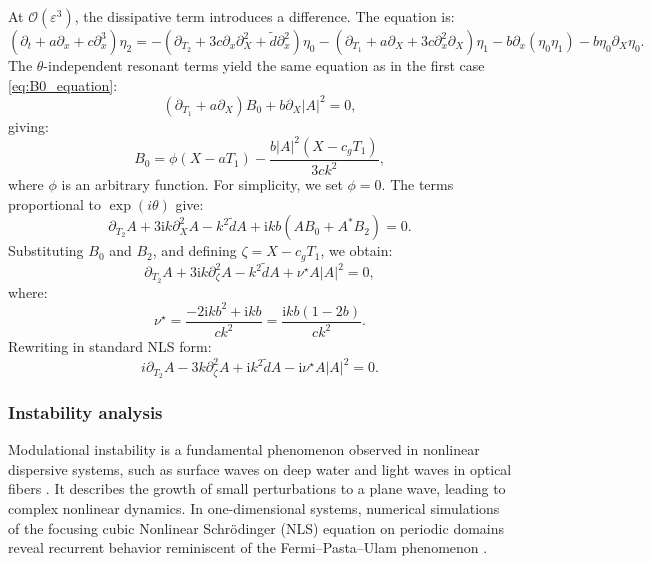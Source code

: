 \documentclass[alpha-refs, 12pt]{wiley-article}
\renewcommand{\O}{\mathcal{O}}
\newcommand{\ui}{\mathrm{i}}
\newcommand{\eps}{\varepsilon}
\begin{document}
At $\O(\eps^3)$, the dissipative term introduces a difference. The equation is:
\begin{equation}\label{eq:third_order_intermediate}
  \left( \partial_t + a \partial_x + c \partial_x^3 \right) \eta_2 = - \left( \partial_{T_2} + 3 c \partial_x \partial_X^2 + \tilde{d} \partial_x^2 \right) \eta_0 - \left( \partial_{T_1} + a \partial_X + 3 c \partial_x^2 \partial_X \right) \eta_1 - b \partial_x ( \eta_0 \eta_1 ) - b \eta_0 \partial_X \eta_0.
\end{equation}
The $\theta$-independent resonant terms yield the same equation as in the first case \eqref{eq:B0_equation}:
\[
  \left( \partial_{T_1} + a \partial_X \right) B_0 + b \partial_X |A|^2 = 0,
\]
giving:
\[
  B_0 = \phi(X - a T_1) - \frac{b |A|^2 (X - c_g T_1)}{3 c k^2},
\]
where $\phi$ is an arbitrary function. For simplicity, we set $\phi = 0$. The terms proportional to $\exp(i \theta)$ give:
\begin{equation}\label{eq:resonant_theta_intermediate}
  \partial_{T_2} A + 3 \ui k \partial_X^2 A - k^2 \tilde{d} A + \ui k b \left( A B_0 + A^* B_2 \right) = 0.
\end{equation}
Substituting $B_0$ and $B_2$, and defining $\zeta = X - c_g T_1$, we obtain:
\begin{equation*}%
  \partial_{T_2} A + 3 \ui k \partial_\zeta^2 A - k^2 \tilde{d} A + \nu^\star A |A|^2 = 0,
\end{equation*}
where:
\[
  \nu^\star = \frac{-2 \ui k b^2 + \ui k b}{c k^2} = \frac{\ui k b (1 - 2 b)}{c k^2}.
\]
Rewriting in standard NLS form:
\begin{equation*}%
i \partial_{T_2} A - 3 k \partial_\zeta^2 A + \ui k^2 \tilde{d} A - \ui \nu^\star A |A|^2 = 0.
\end{equation*}

\subsubsection{Instability analysis}

Modulational instability is a fundamental phenomenon observed in nonlinear dispersive systems, such as surface waves on deep water \cite{Benjamin1967a, Yuen1975, Yuen1980, Remoissenet1996} and light waves in optical fibers \cite{Tai1986}. It describes the growth of small perturbations to a plane wave, leading to complex nonlinear dynamics. In one-dimensional systems, numerical simulations of the focusing cubic Nonlinear Schr\"odinger (NLS) equation on periodic domains reveal recurrent behavior reminiscent of the Fermi--Pasta--Ulam phenomenon \cite{Fermi1955, Yuen1978, Hafizi1981}.
\end{document}
